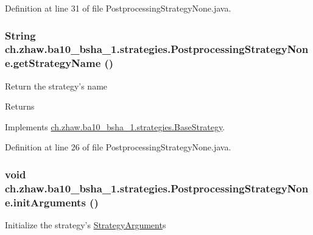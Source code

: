 Definition at line 31 of file PostprocessingStrategyNone.java.\hypertarget{classch_1_1zhaw_1_1ba10__bsha__1_1_1strategies_1_1PostprocessingStrategyNone_a6c5447b46c9ddb6add9d5f3f21ac7721}{
\subsubsection[{getStrategyName}]{\setlength{\rightskip}{0pt plus 5cm}String ch.zhaw.ba10\_\-bsha\_\-1.strategies.PostprocessingStrategyNone.getStrategyName ()}}
\label{classch_1_1zhaw_1_1ba10__bsha__1_1_1strategies_1_1PostprocessingStrategyNone_a6c5447b46c9ddb6add9d5f3f21ac7721}
Return the strategy's name

\begin{DoxyReturn}{Returns}

\end{DoxyReturn}


Implements \hyperlink{classch_1_1zhaw_1_1ba10__bsha__1_1_1strategies_1_1BaseStrategy_aa0ebed55eed45409bad13d43a0058780}{ch.zhaw.ba10\_\-bsha\_\-1.strategies.BaseStrategy}.

Definition at line 26 of file PostprocessingStrategyNone.java.\hypertarget{classch_1_1zhaw_1_1ba10__bsha__1_1_1strategies_1_1PostprocessingStrategyNone_a183d171167e2352ce8679354292d137b}{
\subsubsection[{initArguments}]{\setlength{\rightskip}{0pt plus 5cm}void ch.zhaw.ba10\_\-bsha\_\-1.strategies.PostprocessingStrategyNone.initArguments ()}}
\label{classch_1_1zhaw_1_1ba10__bsha__1_1_1strategies_1_1PostprocessingStrategyNone_a183d171167e2352ce8679354292d137b}
Initialize the strategy's \hyperlink{classch_1_1zhaw_1_1ba10__bsha__1_1_1StrategyArgument}{StrategyArgument}s 

